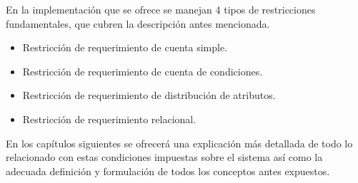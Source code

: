 En la implementación que se ofrece se manejan 4 tipos de restricciones fundamentales, que cubren la descripción antes mencionada.
\begin{itemize}
	\item Restricción de requerimiento de cuenta simple.
	\item Restricción de requerimiento de cuenta de condiciones.
	\item Restricción de requerimiento de distribución de atributos.
	\item Restricción de requerimiento relacional.
\end{itemize}
En los capítulos siguientes se ofrecerá una explicación más detallada de todo lo relacionado con estas condiciones impuestas sobre el sistema así como la adecuada definición y formulación de todos los conceptos antes expuestos.